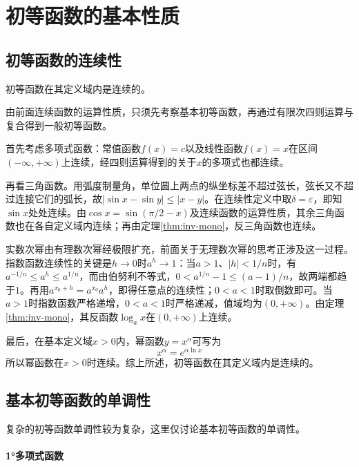 \section{初等函数的基本性质}

\begingroup
\setlength{\parskip}{3pt}
\subsection{初等函数的连续性}
\begin{theorem}
初等函数在其定义域内是连续的。
\end{theorem}

由前面连续函数的运算性质，只须先考察基本初等函数，再通过有限次四则运算与复合得到一般初等函数。

首先考虑多项式函数：常值函数\(f(x) = c\)以及线性函数\(f(x) = x\)在区间\(( - \infty , + \infty )\)上连续，经四则运算得到的关于\(x\)的多项式也都连续。

再看三角函数。用弧度制量角，单位圆上两点的纵坐标差不超过弦长，弦长又不超过连接它们的弧长，故\(|\sin x-\sin y|\le|x-y|\)。在连续性定义中取\(\delta=\varepsilon\)，即知\(\sin x\)处处连续。由\(\cos x=\sin(\pi/2-x)\)及连续函数的运算性质，其余三角函数也在各自定义域内连续；再由定理\ref{thm:inv-mono}，反三角函数也连续。

实数次幂由有理数次幂经极限扩充，前面关于无理数次幂的思考正涉及这一过程。指数函数连续性的关键是\(h\to0\)时\(a^h\to1\)：当\(a>1\)、\(|h|<1/n\)时，有\(a^{-1/n}\le a^h\le a^{1/n}\)，而由伯努利不等式，\(0<a^{1/n}-1\le(a-1)/n\)，故两端都趋于\(1\)。再用\(a^{x_0+h}=a^{x_0}a^h\)，即得任意点的连续性；\(0<a<1\)时取倒数即可。当\(a>1\)时指数函数严格递增，\(0<a<1\)时严格递减，值域均为\((0,+\infty)\)。由定理\ref{thm:inv-mono}，其反函数\(\log_a x\)在\((0,+\infty)\)上连续。

最后，在基本定义域\(x>0\)内，幂函数\(y=x^\alpha\)可写为
\begin{equation}
x^{\alpha} = e^{\alpha \ln x}
\end{equation}
所以幂函数在\(x > 0\)时连续。综上所述，初等函数在其定义域内是连续的。
\endgroup
\newpage
\subsection{基本初等函数的单调性}
复杂的初等函数单调性较为复杂，这里仅讨论基本初等函数的单调性。
\paragraph{1°多项式函数} \mbox{}

